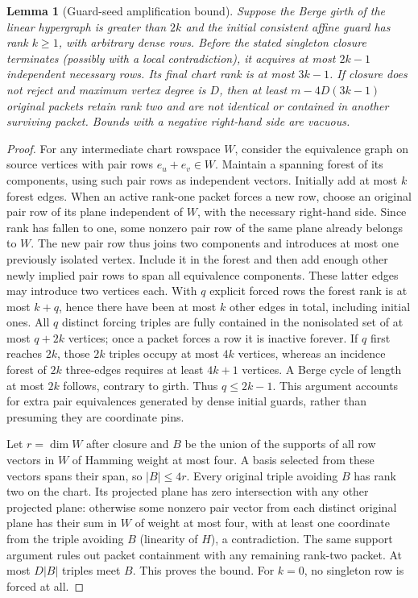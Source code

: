 \documentclass[11pt]{article}
\newtheorem{lemma}[theorem]{Lemma}
\begin{document}
\begin{lemma}[Guard-seed amplification bound]\label{lem:da15-seed}
Suppose the Berge girth of the linear hypergraph is greater than $2k$ and the initial consistent affine guard has rank $k\ge1$, with arbitrary dense rows. Before the stated singleton closure terminates (possibly with a local contradiction), it acquires at most $2k-1$ independent necessary rows. Its final chart rank is at most $3k-1$. If closure does not reject and maximum vertex degree is $D$, then at least $m-4D(3k-1)$ original packets retain rank two and are not identical or contained in another surviving packet. Bounds with a negative right-hand side are vacuous.
\end{lemma}
\begin{proof}
For any intermediate chart rowspace $W$, consider the equivalence graph on source vertices with pair rows $e_u+e_v\in W$. Maintain a spanning forest of its components, using such pair rows as independent vectors. Initially add at most $k$ forest edges. When an active rank-one packet forces a new row, choose an original pair row of its plane independent of $W$, with the necessary right-hand side. Since rank has fallen to one, some nonzero pair row of the same plane already belongs to $W$. The new pair row thus joins two components and introduces at most one previously isolated vertex. Include it in the forest and then add enough other newly implied pair rows to span all equivalence components. These latter edges may introduce two vertices each. With $q$ explicit forced rows the forest rank is at most $k+q$, hence there have been at most $k$ other edges in total, including initial ones. All $q$ distinct forcing triples are fully contained in the nonisolated set of at most $q+2k$ vertices; once a packet forces a row it is inactive forever. If $q$ first reaches $2k$, those $2k$ triples occupy at most $4k$ vertices, whereas an incidence forest of $2k$ three-edges requires at least $4k+1$ vertices. A Berge cycle of length at most $2k$ follows, contrary to girth. Thus $q\le2k-1$. This argument accounts for extra pair equivalences generated by dense initial guards, rather than presuming they are coordinate pins.

Let $r=\dim W$ after closure and $B$ be the union of the supports of all row vectors in $W$ of Hamming weight at most four. A basis selected from these vectors spans their span, so $|B|\le4r$. Every original triple avoiding $B$ has rank two on the chart. Its projected plane has zero intersection with any other projected plane: otherwise some nonzero pair vector from each distinct original plane has their sum in $W$ of weight at most four, with at least one coordinate from the triple avoiding $B$ (linearity of $H$), a contradiction. The same support argument rules out packet containment with any remaining rank-two packet. At most $D|B|$ triples meet $B$. This proves the bound. For $k=0$, no singleton row is forced at all.
\end{proof}
\end{document}
